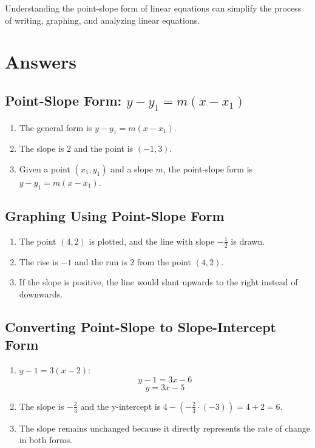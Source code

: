 \documentclass[12pt]{article}
\begin{document}
Understanding the point-slope form of linear equations can simplify the process of writing, graphing, and analyzing linear equations.

\newpage

\section*{Answers}

\subsection*{Point-Slope Form: \(y - y_1 = m(x - x_1)\)}
\begin{enumerate}
    \item The general form is \(y - y_1 = m(x - x_1)\).
    \item The slope is \(2\) and the point is \((-1, 3)\).
    \item Given a point \((x_1, y_1)\) and a slope \(m\), the point-slope form is \(y - y_1 = m(x - x_1)\).
\end{enumerate}

\subsection*{Graphing Using Point-Slope Form}
\begin{enumerate}
    \item The point \((4, 2)\) is plotted, and the line with slope \(-\frac{1}{2}\) is drawn.
    \item The rise is \(-1\) and the run is \(2\) from the point \((4, 2)\).
    \item If the slope is positive, the line would slant upwards to the right instead of downwards.
\end{enumerate}

\subsection*{Converting Point-Slope to Slope-Intercept Form}
\begin{enumerate}
    \item
   \(y - 1 = 3(x - 2)\):
   \[
   y - 1 = 3x - 6
   \]
   \[
   y = 3x - 5
   \]
    \item The slope is \(-\frac{2}{3}\) and the y-intercept is \(4 - \left(-\frac{2}{3} \cdot (-3)\right) = 4 + 2 = 6\).
    \item The slope remains unchanged because it directly represents the rate of change in both forms.
\end{enumerate}
\end{document}
